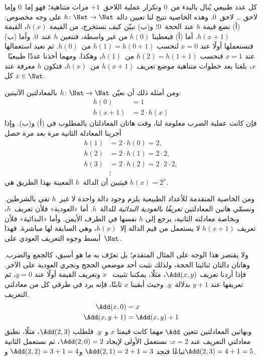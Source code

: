 \documentclass[../../../include/open-logic-section]{subfiles}
\begin{document}

كل عدد طبيعي يُنال بالبدء من~$0$
وتكرار عملية اللاحق~$+1$ مرات متناهية؛ فهو إما~$0$
وإما لاحق … لاحق~$0$. وهذه الخاصية تتيح لنا تعيين دالة
$h\colon\Nat \to \Nat$ على وجه مخصوص:
(أ) نضع قيمة $h$ عند الحجة~$0$؛ و(ب) نبيّن كيف نستخرج، من
القيمة $h(x)$، القيمة $h(x+1)$. أما (أ) فيعطينا $h(0)$ من غير واسطة،
فتتعين $h$ عند~$0$. وأما (ب) فنستعملها أولًا عند $x=0$
لنحسب $h(1)=h(0+1)$ من~$h(0)$. ثم نعيد استعمالها عند $x=1$
فنحسب $h(2)=h(1+1)$ من~$h(1)$، وهكذا. ومهما أخذنا عددًا طبيعيًا~$x$، بلغنا بعد خطوات متناهية
موضع تعريف $h(x+1)$ من~$h(x)$، فتكون $h$ معرفة
عند كل $x\in\Nat$.

ومن أمثلة ذلك أن نعيّن $h\colon\Nat\to\Nat$ بالمعادلتين الآتيتين:
\begin{align*}
h(0) & =  1\\
h(x+1) & =  2 \cdot h(x)
\end{align*}
فإن كانت عملية الضرب معلومة لنا، وفت هاتان المعادلتان
بالمطلوب في (أ) و(ب). وإذا أجرينا المعادلة الثانية مرة بعد مرة حصل
\begin{align*}
  h(1) & = 2\cdot h(0) = 2,\\
  h(2) & = 2\cdot h(1) = 2\cdot 2,\\
  h(3) & = 2 \cdot h(2) = 2\cdot 2 \cdot 2,\\
  & \vdots
\end{align*}
فيتبين أن الدالة~$h$ المعينة بهذا الطريق هي $h(x)=2^x$.

ومن الخاصية المتقدمة للأعداد الطبيعية يلزم وجود دالة واحدة لا غير~$h$ تفي
بالشرطين. ونسمّي هاتين المعادلتين \emph{تعريفًا بالعودية
البدائية} للدالة~$h$. أما «العودية» فلأن تعريف~$h$، وبخاصة معادلته
الثانية، يرجع إلى $h$ نفسها في الطرف الأيمن. وأما «البدائية» فلأن
تعريف $h(x+1)$ لا يستعمل من قيم الدالة إلا~$h(x)$، وهي السابقة لها مباشرة.
فهذا أبسط وجوه التعريف العودي على~$\Nat$.

ولا يقتصر هذا الوجه على المثال المتقدم؛ بل نعرّف به ما هو أسبق، كالجمع والضرب.
وهاتان دالتان ثنائيتا الحجة، ولذلك نثبت أحد موضعي
الحجج ونجري العودية على الآخر. فإذا أردنا تعريف $\Add(x,y)$، مثلًا، يمكننا تثبيت
~$x$ وتعريف القيمة أولًا عند $y=0$، ثم تعريفها عند $y+1$ بدلالة~$y$.
وحيث أبقينا $x$ ثابتًا، فإنه يرد في طرفي كل من معادلتي التعريف.
\begin{align*}
\Add(x,0) & =  x\\
\Add(x,y+1) & =  \Add(x,y)+1
\end{align*}
وبهاتين المعادلتين تتعين $\Add$ مهما كانت قيمتا $x$ و~$y$. فلطلب
$\Add(2,3)$، مثلًا، نطبق معادلتي التعريف عند $x=2$: نستعمل الأولى
لإيجاد $\Add(2,0)=2$، ثم نستعمل الثانية تباعًا فنجد
$\Add(2,1)=2+1=3$ و$\Add(2,2)=3+1=4$ و$\Add(2,3)=4+1=5$.
\end{document}
